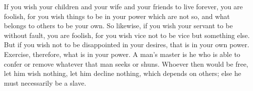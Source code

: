 If you wish your children and your wife and your friends to live forever,
you are foolish, for you wish things to be in your power which are not
so, and what belongs to others to be your own. So likewise, if you wish
your servant to be without fault, you are foolish, for you wish vice not
to be vice but something else. But if you wish not to be disappointed in
your desires, that is in your own power. Exercise, therefore, what is in
your power. A man's master is he who is able to confer or remove whatever
that man seeks or shuns. Whoever then would be free, let him wish
nothing, let him decline nothing, which depends on others; else he must
necessarily be a slave.
